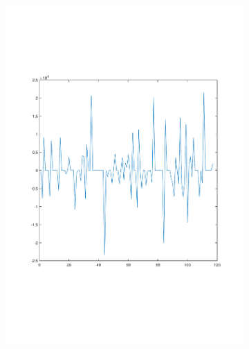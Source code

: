 \documentclass[sigconf]{acmart}
\begin{document}
\begin{figure}[tp]
	\centering
	\begin{subfigure}[t]{0.4\linewidth}
		\centering
		\includegraphics[width=0.95\linewidth, trim={100 100 0 0}, clip=true]{fig/total_life_8}
		\label{fig:3.1a}
	\end{subfigure}
	\begin{subfigure}[t]{0.4\linewidth}
		\centering

\end{subfigure}
\end{figure}
\end{document}

